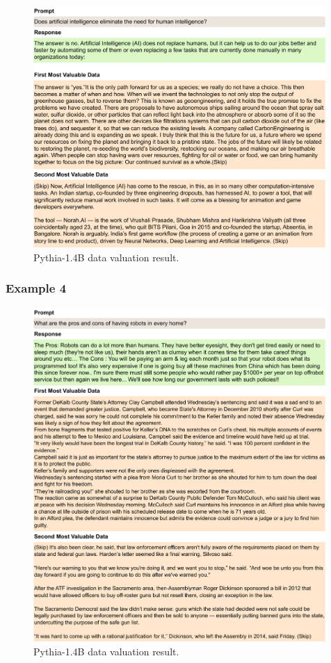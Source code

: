 \begin{figure}[htbp]
    \centering
    \includegraphics[width=0.99\textwidth]{figures/pythia_appendix3.pdf}
    \caption{Pythia-1.4B data valuation result.}
\end{figure}

\clearpage
\subsubsection{Example 4}

\begin{figure}[htbp]
    \centering
    \includegraphics[width=0.99\textwidth]{figures/pythia_appendix4.pdf}
    \caption{Pythia-1.4B data valuation result.}
\end{figure}

